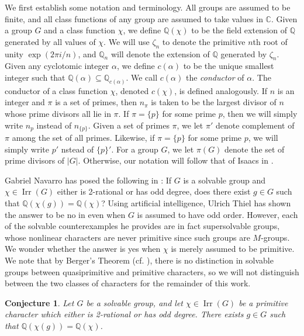 \documentclass[12pt]{amsart}
\newtheorem{conjecture}[theorem]{Conjecture}
\theoremstyle{definition}
\newcommand{\Q}{\mathbb{Q}}
\newcommand{\C}{\mathbb{C}}
\DeclareMathOperator{\Irr}{Irr}
\begin{document}
We first establish some notation and terminology. All groups are assumed to be finite, and all class functions of any group are assumed to take values in $\C$. Given a group $G$ and a class function $\chi$, we define $\Q(\chi)$ to be the field extension of $\Q$ generated by all values of $\chi$. We will use $\zeta_n$ to denote the primitive $n$th root of unity $\exp(2\pi i / n)$, and $\Q_n$ will denote the extension of $\Q$ generated by $\zeta_n$. Given any cyclotomic integer $\alpha$, we define $c(\alpha)$ to be the unique smallest integer such that $\Q(\alpha) \subseteq \Q_{c(\alpha)}$. We call $c(\alpha)$ the \emph{conductor} of $\alpha$. The conductor of a class function $\chi$, denoted $c(\chi)$, is defined analogously. If $n$ is an integer and $\pi$ is a set of primes, then $n_{\pi}$ is taken to be the largest divisor of $n$ whose prime divisors all lie in $\pi$. If $\pi = \{p\}$ for some prime $p$, then we will simply write $n_p$ instead of $n_{\{p\}}$. Given a set of primes $\pi$, we let $\pi'$ denote complement of $\pi$ among the set of all primes. Likewise, if $\pi = \{p\}$ for some prime $p$, we will simply write $p'$ nstead of $\{p\}'$. For a group $G$, we let $\pi(G)$ denote the set of prime divisors of $|G|$. Otherwise, our notation will follow that of Isaacs in \cite{Is}. 

Gabriel Navarro has posed the following in \cite[Problem 7.3]{Nav}: If $G$ is a solvable group and $\chi \in \Irr(G)$ either is 2-rational or has odd degree, does there exist $g \in G$ such that $\Q(\chi(g)) = \Q(\chi)$? Using artificial intelligence, Ulrich Thiel has shown the answer to be no in \cite{Thiel} even when $G$ is assumed to have odd order. However, each of the solvable counterexamples he provides are in fact supersolvable groups, whose nonlinear characters are never primitive since such groups are $M$-groups. We wonder whether the answer is yes when $\chi$ is merely assumed to be primitive. We note that by Berger's Theorem (cf. \cite[Theorem 11.33]{Is}), there is no distinction in solvable groups between quasiprimitive and primitive characters, so we will not distinguish between the two classes of characters for the remainder of this work.
\begin{conjecture}\label{big-conj}
	Let $G$ be a solvable group, and let $\chi \in \Irr(G)$ be a primitive character which either is 2-rational or has odd degree. There exists $g \in G$ such that $\Q(\chi(g)) = \Q(\chi)$. 
\end{conjecture}
\end{document}
